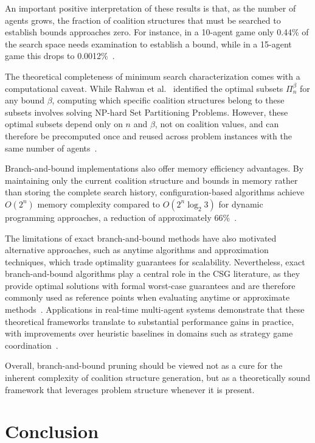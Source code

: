 \documentclass{article}
\begin{document}
An important positive interpretation of these results is that, as the number of agents grows, the fraction of coalition structures that must be searched to establish bounds approaches zero. For instance, in a 10-agent game only 0.44\% of the search space needs examination to establish a bound, while in a 15-agent game this drops to 0.0012\%~\cite{sandholm1999coalition}.

The theoretical completeness of minimum search characterization comes with a computational caveat. While Rahwan et al.~\cite{rahwan2011minimum} identified the optimal subsets $\Pi^{\beta}_n$ for any bound $\beta$, computing which specific coalition structures belong to these subsets involves solving NP-hard Set Partitioning Problems. However, these optimal subsets depend only on $n$ and $\beta$, not on coalition values, and can therefore be precomputed once and reused across problem instances with the same number of agents~\cite{rahwan2011minimum}.

Branch-and-bound implementations also offer memory efficiency advantages. By maintaining only the current coalition structure and bounds in memory rather than storing the complete search history, configuration-based algorithms achieve $O(2^n)$ memory complexity compared to $O(2^n \log_2 3)$ for dynamic programming approaches, a reduction of approximately 66\%~\cite{rahwan2007near}.

The limitations of exact branch-and-bound methods have also motivated alternative approaches, such as anytime algorithms and approximation techniques, which trade optimality guarantees for scalability. Nevertheless, exact branch-and-bound algorithms play a central role in the CSG literature, as they provide optimal solutions with formal worst-case guarantees and are therefore commonly used as reference points when evaluating anytime or approximate methods~\cite{sandholm1999coalition,rahwan2007near,rahwan2011minimum}. Applications in real-time multi-agent systems demonstrate that these theoretical frameworks translate to substantial performance gains in practice, with improvements over heuristic baselines in domains such as strategy game coordination~\cite{prantare2017algorithm}.

Overall, branch-and-bound pruning should be viewed not as a cure for the inherent complexity of coalition structure generation, but as a theoretically sound framework that leverages problem structure whenever it is present.

\section{Conclusion}
\end{document}
